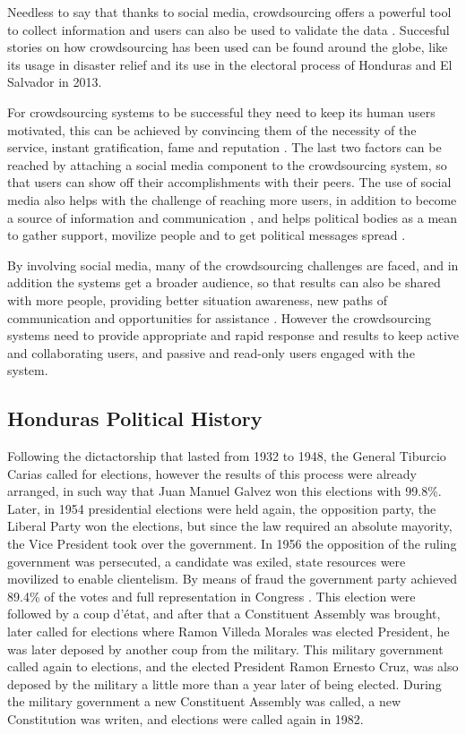 \documentclass[a4paper,10pt]{article}
\begin{document}
Needless to say that thanks to social media, crowdsourcing offers a powerful tool to collect information and users can also be used to validate the data \citep{gao2011}. Succesful stories on how crowdsourcing has been used can be found around the globe, like its usage in disaster relief \citep{yin2012, gao2011} and its use in the electoral process of Honduras and El Salvador in 2013.

For crowdsourcing systems to be successful they need to keep its human users motivated, this can be achieved by convincing them of the necessity of the service, instant gratification, fame and reputation \citep{doan2011}. The last two factors can be reached by attaching a social media component to the crowdsourcing system, so that users can show off their accomplishments with their peers. The use of social media also helps with the challenge of reaching more users, in addition to become a source of information and communication \citep{yin2012}, and helps political bodies as a mean to gather support, movilize people and to get political messages spread \citep{map2014}.

By involving social media, many of the crowdsourcing challenges are faced, and in addition the systems get a broader audience, so that results can also be shared with more people, providing better situation awareness, new paths of communication and opportunities for assistance \citep{gao2011}. However the crowdsourcing systems need to provide appropriate and rapid response and results to keep active and collaborating users, and passive and read-only users engaged with the system.






\subsection{Honduras Political History}

Following the dictactorship that lasted from 1932 to 1948, the General Tiburcio Carias called for elections, however the results of this process were already arranged, in such way that Juan Manuel Galvez won this elections with 99.8\%. Later, in 1954 presidential elections were held again, the opposition party, the Liberal Party won the elections, but since the law required an absolute mayority, the Vice President took over the government. In 1956 the opposition of the ruling government was persecuted, a candidate was exiled, state resources were movilized to enable clientelism. By means of fraud the government party achieved 89.4\% of the votes and full representation in Congress \citep{romero2014}. This election were followed by a coup d'\'{e}tat, and after that a Constituent Assembly was brought, later called for elections where Ramon Villeda Morales was elected President, he was later deposed by another coup from the military. This military government called again to elections, and the elected President Ramon Ernesto Cruz, was also deposed by the military a little more than a year later of being elected. During the military government a new Constituent Assembly was called, a new Constitution was writen, and elections were called again in 1982.
\end{document}
